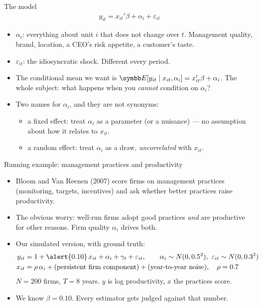 \documentclass[aspectratio=169,11pt]{beamer}
\begin{document}
\begin{frame}{The model}
\begin{align*}
	y_{it} = x_{it}'\beta + \alpha_i + \varepsilon_{it}
\end{align*}
\begin{itemize}
	\item $\alpha_i$: \alert{everything about unit $i$ that does not change over $t$}.
	Management quality, brand, location, a CEO's risk appetite, a customer's taste.
	\medskip
	\item $\varepsilon_{it}$: the idiosyncratic shock. Different every period.
	\medskip
	\item The conditional mean we want is $\E[y_{it} \mid x_{it}, \alpha_i] = x_{it}'\beta + \alpha_i$.
	The whole subject: what happens when you \emph{cannot} condition on $\alpha_i$?
	\medskip
	\item Two names for $\alpha_i$, and they are not synonyms:
	\begin{itemize}
		\item a \alert{fixed effect}: treat $\alpha_i$ as a parameter (or a nuisance) --- no assumption
		about how it relates to $x_{it}$.
		\item a \alert{random effect}: treat $\alpha_i$ as a draw, \emph{uncorrelated} with $x_{it}$.
	\end{itemize}
\end{itemize}
\end{frame}


\begin{frame}{Running example: management practices and productivity}
\begin{itemize}
	\item Bloom and Van Reenen (2007) score firms on management practices (monitoring, targets,
	incentives) and ask whether better practices raise productivity.
	\medskip
	\item The obvious worry: well-run firms adopt good practices \emph{and} are productive for
	other reasons. Firm quality $\alpha_i$ drives both.
	\medskip
	\item Our simulated version, with ground truth:
	\begin{align*}
		y_{it} &= 1 + \alert{0.10}\, x_{it} + \alpha_i + \gamma_t + \varepsilon_{it}, \qquad
		\alpha_i \sim N(0, 0.5^2),\ \varepsilon_{it} \sim N(0, 0.3^2) \\
		x_{it} &= \rho\,\alpha_i + \text{(persistent firm component)} + \text{(year-to-year noise)}, \quad \rho = 0.7
	\end{align*}
	$N = 200$ firms, $T = 8$ years. $y$ is log productivity, $x$ the practices score.
	\medskip
	\item We know $\beta = 0.10$. Every estimator gets judged against that number.
\end{itemize}
\end{frame}
\end{document}
